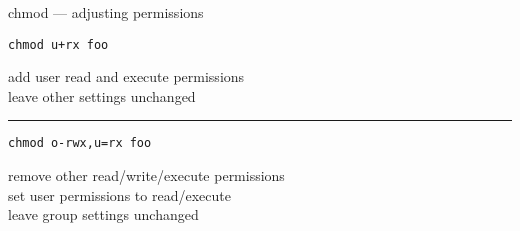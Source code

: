 \begin{frame}[fragile]{chmod --- adjusting permissions}
\begin{Verbatim}
chmod u+rx foo
\end{Verbatim}
add user read and execute permissions \\
leave other settings unchanged
    \vspace{.1cm}
\hrule
\begin{Verbatim}
chmod o-rwx,u=rx foo
\end{Verbatim}
remove other read/write/execute permissions \\
set user permissions to read/execute \\
leave group settings unchanged
\end{frame}
